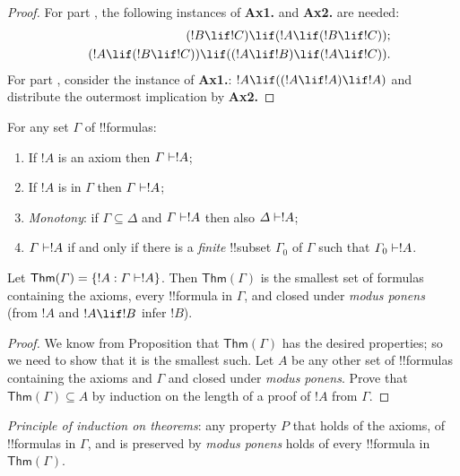 \documentclass[../../include/open-logic-section]{subfiles}
\begin{document}
\begin{proof}
  For part , the following instances
  of \textbf{Ax1.} and \textbf{Ax2.} are needed:
  \begin{eqnarray*}
    &&(!B \lif !C) \lif (!A \lif (!B \lif !C)); \\
    && (!A \lif (!B \lif !C)) \lif ((!A \lif !B) \lif
    (!A \lif !C)).
  \end{eqnarray*}
For part , consider the instance of
\textbf{Ax1.}: $!A \lif ((!A \lif !A) \lif
!A)$ and distribute the outermost implication by \textbf{Ax2.}
\end{proof}

\begin{prop}
  For any set $\Gamma$ of !!{formula}s:
  \begin{enumerate}
  \item If $!A$ is an axiom then $\Gamma \Proves !A$;
  \item If $!A$ is in $\Gamma$ then $\Gamma \Proves
    !A$;
  \item \emph{Monotony}: if $\Gamma \subseteq \Delta$ and $\Gamma
    \Proves !A$ then also $\Delta \Proves
    !A$; 
  \item $\Gamma \Proves !A$ if and only if there is a
    \emph{finite} !!{subset} $\Gamma_0$ of $\Gamma$ such that $\Gamma_0
    \Proves !A$.
  \end{enumerate}
\end{prop}

\begin{thm}
  Let $\mathsf{Thm}(\Gamma) = \{!A : \Gamma \Proves
  !A\}$. Then $\mathsf{Thm}(\Gamma)$ is the smallest set of
  formulas containing the axioms, every !!{formula} in $\Gamma$, and
  closed under \emph{modus ponens} (from $!A$ and $!A
  \lif !B$ infer $!B$).
\end{thm} 

\begin{proof}
  We know from Proposition  that
  $\mathsf{Thm}(\Gamma)$ has the desired properties; so we need to
  show that it is the smallest such. Let $A$ be any other set of
  !!{formula}s containing the axioms and $\Gamma$ and closed under
  \emph{modus ponens}. Prove that $\mathsf{Thm}(\Gamma) \subseteq A$
  by induction on the length of a proof of $!A$ from $\Gamma$.
\end{proof}

\begin{cor}
  \emph{Principle of induction on theorems}: any property $P$ that
  holds of the axioms, of !!{formula}s in $\Gamma$, and is preserved by
  \emph{modus ponens} holds of every !!{formula} in
  $\mathsf{Thm}(\Gamma)$.
\end{cor}
\end{document}
